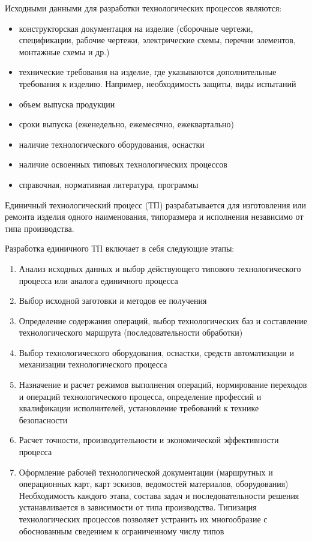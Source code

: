 \documentclass[unicode, 12pt, a4paper, oneside]{article}
\begin{document}
Исходными данными для разработки технологических процессов являются:

\begin{itemize}
\item конструкторская документация на изделие (сборочные чертежи, спецификации, рабочие чертежи, электрические схемы, перечни элементов, монтажные схемы и др.)
\item технические требования на изделие, где указываются дополнительные требования к изделию. Например, необходимость защиты, виды испытаний
\item объем выпуска продукции
\item сроки выпуска (еженедельно, ежемесячно, ежеквартально)
\item наличие технологического оборудования, оснастки
\item наличие освоенных типовых технологических процессов
\item справочная, нормативная литература, программы
\end{itemize}

Единичный технологический процесс (ТП) разрабатывается для изготовления или ремонта изделия одного наименования, типоразмера и исполнения независимо от типа производства.

Разработка единичного ТП включает в себя следующие этапы:

\begin{enumerate}
\item Анализ исходных данных и выбор действующего типового
технологического процесса или аналога единичного процесса
\item Выбор исходной заготовки и методов ее получения
\item Определение содержания операций, выбор технологических баз и составление технологического маршрута (последовательности обработки)
\item Выбор технологического оборудования, оснастки, средств автоматизации и механизации технологического процесса
\item Назначение и расчет режимов выполнения операций, нормирование переходов и операций технологического процесса, определение профессий и квалификации исполнителей, установление требований к технике безопасности
\item Расчет точности, производительности и экономической эффективности процесса
\item Оформление рабочей технологической документации (маршрутных и операционных карт, карт эскизов, ведомостей материалов, оборудования)
Необходимость каждого этапа, состава задач и последовательности решения устанавливается в зависимости от типа производства. Типизация технологических процессов позволяет устранить их многообразие с обоснованным сведением к ограниченному числу типов
\end{enumerate}
\end{document}
